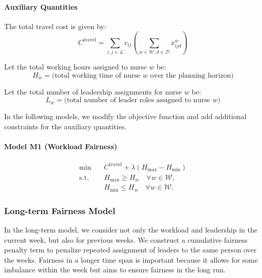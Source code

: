 \paragraph{Auxiliary Quantities}
The total travel cost is given by:
\begin{equation}
C^{\text{travel}} = \sum_{i,j \in \mathcal{L}} c_{ij} 
\left(\sum_{w \in \mathcal{W}, d \in \mathcal{D}} x_{ijd}^{w} \right)
\end{equation}

Let the total working hours assigned to nurse $w$ be:
\begin{equation}
H_w = \text{(total working time of nurse $w$ over the planning horizon)}
\end{equation}

Let the total number of leadership assignments for nurse $w$ be:
\begin{equation}
L_w = \text{(total number of leader roles assigned to nurse $w$)}
\end{equation}

In the following models, we modify the objective function and add additional constraints for the auxiliary quantities.

\paragraph{Model M1 (Workload Fairness)}

\begin{align}
\min \quad & C^{\text{travel}} + \lambda \left(H_{\max} - H_{\min}\right) \\
\text{s.t.} \quad 
& H_{\max} \ge H_w \quad \forall w \in \mathcal{W}, \\
& H_{\min} \le H_w \quad \forall w \in \mathcal{W}.
\end{align}





\subsubsection{Long-term Fairness Model}
In the long-term model, we consider not only the workload and leadership in the current week, but also for previous weeks. We construct a cumulative fairness penalty term to penalize repeated assignment of leaders to the same person over the weeks. Fairness in a longer time span is important because it allows for some imbalance within the week but aims to ensure fairness in the long run.

